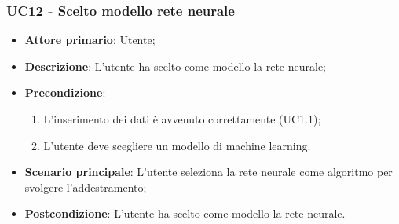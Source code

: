 \subsubsection{UC12 - Scelto modello rete neurale}
\label{sssec:uc12}
\begin{itemize}
  \item \textbf{Attore primario}: Utente;
  \item \textbf{Descrizione}: L'utente ha scelto come modello la rete neurale;
  \item \textbf{Precondizione}:
  \begin{enumerate}
    \item L'inserimento dei dati è avvenuto correttamente (UC1.1);
    \item L'utente deve scegliere un modello di machine learning.
  \end{enumerate}
  \item \textbf{Scenario principale}: L'utente seleziona la rete neurale come algoritmo per svolgere l'addestramento;
  \item \textbf{Postcondizione}: L'utente ha scelto come modello la rete neurale.
\end{itemize}
